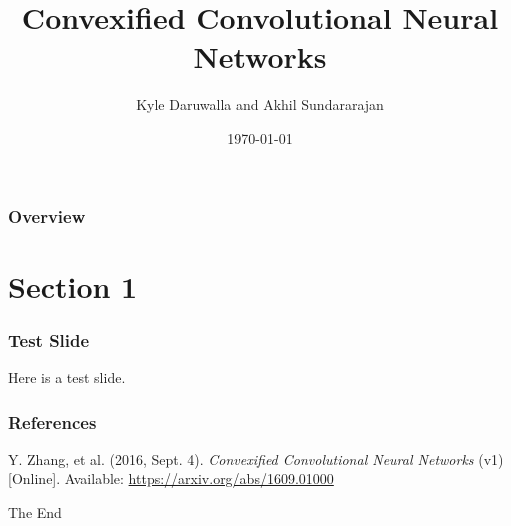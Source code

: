 \documentclass{beamer}
\title[ECE 901 Paper Presentation]{Convexified Convolutional Neural Networks} %
\author{Kyle Daruwalla and Akhil Sundararajan}
\institute[UW-Madison]{ECE 901 Fall 2016}
\date{\today}
\begin{document}
\begin{frame}
	\titlepage
\end{frame}

\begin{frame}
	\frametitle{Overview}
	\tableofcontents
\end{frame}


\section{Section 1}
\begin{frame}
	\frametitle{Test Slide}
	Here is a test slide.
\end{frame}


\begin{frame}
	\frametitle{References}
	\footnotesize{
		\begin{thebibliography}{9} %
			Y. Zhang, et al. (2016, Sept. 4).
			\emph{Convexified Convolutional Neural Networks} (v1) [Online].
			Available: \url{https://arxiv.org/abs/1609.01000}
		\end{thebibliography}
	}
\end{frame}


\begin{frame}
	\Huge{\centerline{The End}}
\end{frame}
\end{document}
